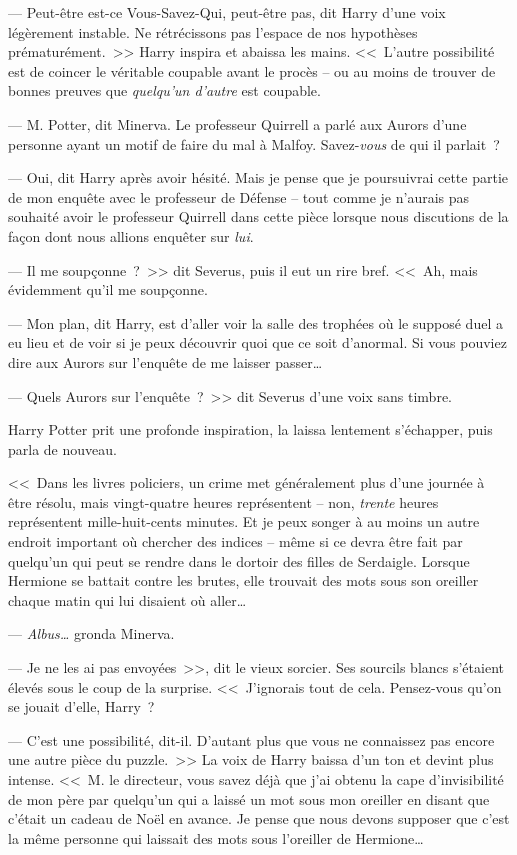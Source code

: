 --- Peut-être est-ce Vous-Savez-Qui, peut-être pas, dit Harry d'une voix légèrement instable. Ne rétrécissons pas l'espace de nos hypothèses prématurément.~>> Harry inspira et abaissa les mains. <<~L'autre possibilité est de coincer le véritable coupable avant le procès -- ou au moins de trouver de bonnes preuves que \emph{quelqu'un d'autre} est coupable.

--- M. Potter, dit Minerva. Le professeur Quirrell a parlé aux Aurors d'une personne ayant un motif de faire du mal à Malfoy. Savez-\emph{vous} de qui il parlait~?

--- Oui, dit Harry après avoir hésité. Mais je pense que je poursuivrai cette partie de mon enquête avec le professeur de Défense -- tout comme je n'aurais pas souhaité avoir le professeur Quirrell dans cette pièce lorsque nous discutions de la façon dont nous allions enquêter sur \emph{lui}.

--- Il me soupçonne~?~>> dit Severus, puis il eut un rire bref. <<~Ah, mais évidemment qu'il me soupçonne.

--- Mon plan, dit Harry, est d'aller voir la salle des trophées où le supposé duel a eu lieu et de voir si je peux découvrir quoi que ce soit d'anormal. Si vous pouviez dire aux Aurors sur l'enquête de me laisser passer…

--- Quels Aurors sur l'enquête~?~>> dit Severus d'une voix sans timbre.

Harry Potter prit une profonde inspiration, la laissa lentement s'échapper, puis parla de nouveau.

<<~Dans les livres policiers, un crime met généralement plus d'une journée à être résolu, mais vingt-quatre heures représentent -- non, \emph{trente} heures représentent mille-huit-cents minutes. Et je peux songer à au moins un autre endroit important où chercher des indices -- même si ce devra être fait par quelqu'un qui peut se rendre dans le dortoir des filles de Serdaigle. Lorsque Hermione se battait contre les brutes, elle trouvait des mots sous son oreiller chaque matin qui lui disaient où aller…

--- \emph{Albus…} gronda Minerva.

--- Je ne les ai pas envoyées~>>, dit le vieux sorcier. Ses sourcils blancs s'étaient élevés sous le coup de la surprise. <<~J'ignorais tout de cela. Pensez-vous qu'on se jouait d'elle, Harry~?

--- C'est une possibilité, dit-il. D'autant plus que vous ne connaissez pas encore une autre pièce du puzzle.~>> La voix de Harry baissa d'un ton et devint plus intense. <<~M. le directeur, vous savez déjà que j'ai obtenu la cape d'invisibilité de mon père par quelqu'un qui a laissé un mot sous mon oreiller en disant que c'était un cadeau de Noël en avance. Je pense que nous devons supposer que c'est la même personne qui laissait des mots sous l'oreiller de Hermione…

